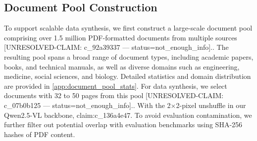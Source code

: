 \documentclass{llmxive}
\begin{document}
\subsection{Document Pool Construction}
\label{sec:curation:document_pool_construction}
To support scalable data synthesis, we first construct a large-scale document pool comprising over 1.5 million PDF-formatted documents from multiple sources [UNRESOLVED-CLAIM: c_92a39337 — status=not_enough_info]..
The resulting pool spans a broad range of document types, including academic papers, books, and technical manuals, as well as diverse domains such as engineering, medicine, social sciences, and biology.
Detailed statistics and domain distribution are provided in \cref{app:document_pool_stats}.
For data synthesis, we select documents with 32 to 50 pages from this pool [UNRESOLVED-CLAIM: c_07b0b125 — status=not_enough_info]..
With the 2$\times$2-pixel unshuffle in our Qwen2.5-VL backbone, {{claim:c_136a4e47}}.
To avoid evaluation contamination, we further filter out potential overlap with evaluation benchmarks using SHA-256 hashes of PDF content.
\end{document}
